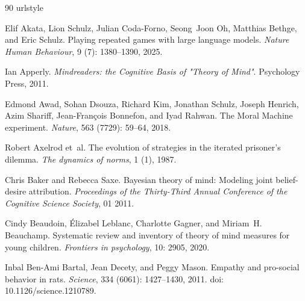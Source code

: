 \begin{thebibliography}{90}
\providecommand{\natexlab}[1]{#1}
\providecommand{\url}[1]{\texttt{#1}}
\expandafter\ifx\csname urlstyle\endcsname\relax
  \providecommand{\doi}[1]{doi: #1}\else
  \providecommand{\doi}{doi: \begingroup \urlstyle{rm}\Url}\fi

Elif Akata, Lion Schulz, Julian Coda-Forno, Seong~Joon Oh, Matthias Bethge, and Eric Schulz.
\newblock Playing repeated games with large language models.
\newblock \emph{Nature Human Behaviour}, 9 (7): 1380--1390, 2025.

Ian Apperly.
\newblock \emph{{Mindreaders: the Cognitive Basis of "Theory of Mind"}}.
\newblock Psychology Press, 2011.

Edmond Awad, Sohan Dsouza, Richard Kim, Jonathan Schulz, Joseph Henrich, Azim Shariff, Jean-Fran{\c{c}}ois Bonnefon, and Iyad Rahwan.
\newblock The {Moral Machine} experiment.
\newblock \emph{Nature}, 563 (7729): 59--64, 2018.

Robert Axelrod et~al.
\newblock The evolution of strategies in the iterated prisoner’s dilemma.
\newblock \emph{The dynamics of norms}, 1 (1), 1987.

Chris Baker and Rebecca Saxe.
\newblock Bayesian theory of mind: Modeling joint belief-desire attribution.
\newblock \emph{Proceedings of the Thirty-Third Annual Conference of the Cognitive Science Society}, 01 2011.

Cindy Beaudoin, {\'E}lizabel Leblanc, Charlotte Gagner, and Miriam~H. Beauchamp.
\newblock Systematic review and inventory of theory of mind measures for young children.
\newblock \emph{Frontiers in psychology}, 10: 2905, 2020.

Inbal {Ben-Ami Bartal}, Jean Decety, and Peggy Mason.
\newblock Empathy and pro-social behavior in rats.
\newblock \emph{Science}, 334 (6061): 1427--1430, 2011.
\newblock \doi{10.1126/science.1210789}.


\end{thebibliography}

